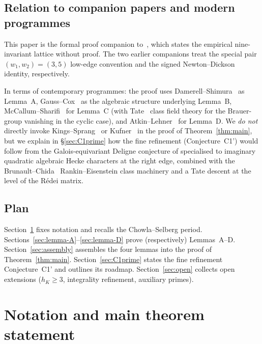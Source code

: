 \documentclass[11pt,a4paper]{amsart}
\theoremstyle{plain}
\theoremstyle{definition}
\begin{document}
\subsection{Relation to companion papers and modern programmes}

This paper is the formal proof companion to~\cite{Remondiere2026P6},
which states the empirical nine-invariant lattice without proof.  The
two earlier companions
\cite{Remondiere2026qD,Remondiere2026ND} treat the special pair
$(w_1, w_2) = (3, 5)$ low-edge convention and the signed
Newton--Dickson identity, respectively.

In terms of contemporary programmes: the proof uses
Damerell--Shimura~\cite{Damerell1971a, Shimura1976} as Lemma~A,
Gauss--Cox~\cite{Gauss1801, Cox1989} as the algebraic structure
underlying Lemma~B, McCallum--Sharifi~\cite{McCallumSharifi2002}
for Lemma~C (with Tate~\cite{Tate1967} class field theory for the
Brauer-group vanishing in the cyclic case), and
Atkin--Lehner~\cite{AtkinLehner1970} for Lemma~D.  We \emph{do not}
directly invoke Kings--Sprang~\cite{KingsSprang2025} or
Kufner~\cite{Kufner2024} in the proof of Theorem~\ref{thm:main}, but
we explain in \S\ref{sec:C1prime} how the fine refinement
(Conjecture~C1') would follow from the Galois-equivariant Deligne
conjecture of \cite{Kufner2024} specialised to imaginary quadratic
algebraic Hecke characters at the right edge, combined with the
Brunault--Chida~\cite{BrunaultChida2015} Rankin--Eisenstein class
machinery and a Tate descent at the level of the R\'edei matrix.

\subsection{Plan}

Section~\ref{sec:setup} fixes notation and recalls the
Chowla--Selberg period.  Sections~\ref{sec:lemma-A}--\ref{sec:lemma-D}
prove (respectively) Lemmas~A--D.  Section~\ref{sec:assembly}
assembles the four lemmas into the proof of Theorem~\ref{thm:main}.
Section~\ref{sec:C1prime} states the fine refinement
Conjecture~C1' and outlines its roadmap.  Section~\ref{sec:open}
collects open extensions ($h_K \ge 3$, integrality refinement,
auxiliary primes).

\section{Notation and main theorem statement}\label{sec:setup}
\end{document}
